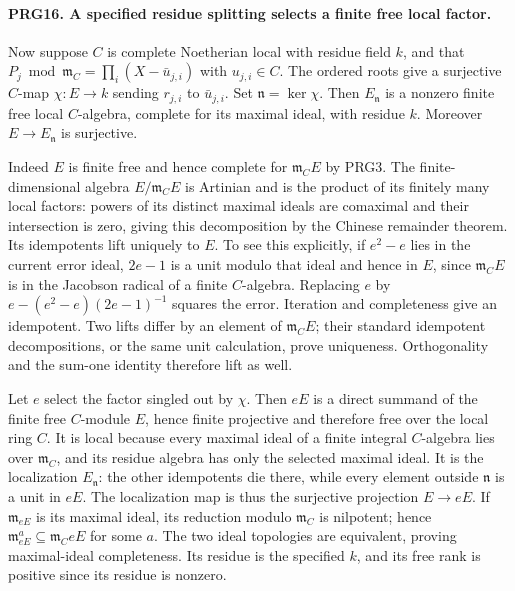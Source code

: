 \paragraph{PRG16. A specified residue splitting selects a finite free local factor.}
\label{claim:PRG16}
Now suppose \(C\) is complete Noetherian local with residue field
\(k\), and that \(P_j\bmod\mathfrak m_C=\prod_i(X-\bar u_{j,i})\)
with \(u_{j,i}\in C\). The ordered roots give a surjective
\(C\)-map \(\chi:E\to k\) sending \(r_{j,i}\) to
\(\bar u_{j,i}\). Set \(\mathfrak n=\ker\chi\). Then
\(E_{\mathfrak n}\) is a nonzero finite free local
\(C\)-algebra, complete for its maximal ideal, with residue \(k\).
Moreover \(E\to E_{\mathfrak n}\) is surjective.

Indeed \(E\) is finite free and hence complete for
\(\mathfrak m_C E\) by PRG3. The finite-dimensional algebra
\(E/\mathfrak m_CE\) is Artinian and is the product of its
finitely many local factors: powers of its distinct maximal
ideals are comaximal and their intersection is zero, giving this
decomposition by the Chinese remainder theorem. Its idempotents
lift uniquely to \(E\). To see this explicitly, if \(e^2-e\)
lies in the current error ideal, \(2e-1\) is a unit modulo that
ideal and hence in \(E\), since \(\mathfrak m_C E\) is in the
Jacobson radical of a finite \(C\)-algebra. Replacing
\(e\) by \(e-(e^2-e)(2e-1)^{-1}\) squares the error.
Iteration and completeness give an idempotent. Two lifts differ
by an element of \(\mathfrak m_CE\); their standard idempotent
decompositions, or the same unit calculation, prove uniqueness.
Orthogonality and the sum-one identity therefore lift as well.

Let \(e\) select the factor singled out by \(\chi\).
Then \(eE\) is a direct summand of the finite free \(C\)-module
\(E\), hence finite projective and therefore free over the local
ring \(C\). It is local because every maximal ideal of a finite
integral \(C\)-algebra lies over \(\mathfrak m_C\), and its
residue algebra has only the selected maximal ideal. It is the
localization \(E_{\mathfrak n}\): the other idempotents die there,
while every element outside \(\mathfrak n\) is a unit in \(eE\).
The localization map is thus the surjective projection \(E\to eE\).
If \(\mathfrak m_{eE}\) is its maximal ideal, its reduction
modulo \(\mathfrak m_C\) is nilpotent; hence
\(\mathfrak m_{eE}^{a}\subseteq\mathfrak m_CeE\) for some \(a\).
The two ideal topologies are equivalent, proving maximal-ideal
completeness. Its residue is the specified \(k\), and its free
rank is positive since its residue is nonzero.

